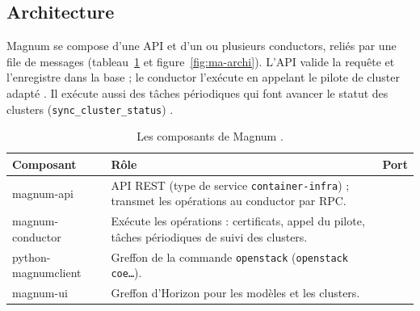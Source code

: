 \subsection{Architecture}\label{sec:ma-archi}

Magnum se compose d'une API et d'un ou plusieurs conductors, reliés par une file de messages (tableau~\ref{tab:ma-composants} et
figure~\ref{fig:ma-archi}). L'API valide la requête et l'enregistre dans la base ; le conductor l'exécute en appelant le pilote
de cluster adapté \parencite{magnum-user}. Il exécute aussi des tâches périodiques qui font avancer le statut des clusters
(\texttt{sync\_\allowbreak cluster\_\allowbreak status}) \parencite{magnum-source}.

\begin{table}[!ht]
\centering
\renewcommand{\arraystretch}{1.3}
\begin{tabular}{@{}>{\raggedright\arraybackslash\ttfamily\small}p{3.6cm}>{\raggedright\arraybackslash}p{9.6cm}>{\raggedright\arraybackslash}p{2.3cm}@{}}
\toprule
\textrm{\textbf{Composant}} & \textbf{Rôle} & \textbf{Port} \\
\midrule
magnum-api & API REST (type de service \texttt{container-infra}) ; transmet les opérations au conductor par RPC. & 9511 \\
magnum-conductor & Exécute les opérations : certificats, appel du pilote, tâches périodiques de suivi des clusters. & \\
python-magnumclient & Greffon de la commande \texttt{openstack} (\texttt{openstack coe\dots}). & \\
magnum-ui & Greffon d'Horizon pour les modèles et les clusters. & \\
\bottomrule
\end{tabular}
\caption{Les composants de Magnum \parencite{magnum-install,osc-coe}.}
\label{tab:ma-composants}
\end{table}


